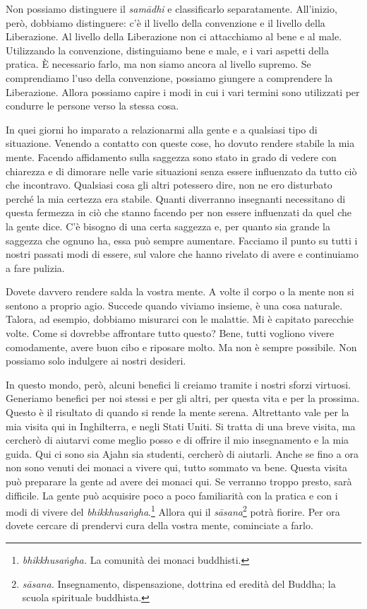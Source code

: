 Non possiamo distinguere il \emph{samādhi} e classificarlo
separatamente. All'inizio, però, dobbiamo distinguere: c'è il livello
della convenzione e il livello della Liberazione. Al livello della
Liberazione non ci attacchiamo al bene e al male. Utilizzando la
convenzione, distinguiamo bene e male, e i vari aspetti della pratica. È
necessario farlo, ma non siamo ancora al livello supremo. Se
comprendiamo l'uso della convenzione, possiamo giungere a comprendere la
Liberazione. Allora possiamo capire i modi in cui i vari termini sono
utilizzati per condurre le persone verso la stessa cosa.

In quei giorni ho imparato a relazionarmi alla gente e a qualsiasi tipo
di situazione. Venendo a contatto con queste cose, ho dovuto rendere
stabile la mia mente. Facendo affidamento sulla saggezza sono stato in
grado di vedere con chiarezza e di dimorare nelle varie situazioni senza
essere influenzato da tutto ciò che incontravo. Qualsiasi cosa gli altri
potessero dire, non ne ero disturbato perché la mia certezza era
stabile. Quanti diverranno insegnanti necessitano di questa fermezza in
ciò che stanno facendo per non essere influenzati da quel che la gente
dice. C'è bisogno di una certa saggezza e, per quanto sia grande la
saggezza che ognuno ha, essa può sempre aumentare. Facciamo il punto su
tutti i nostri passati modi di essere, sul valore che hanno rivelato di
avere e continuiamo a fare pulizia.

Dovete davvero rendere salda la vostra mente. A volte il corpo o la
mente non si sentono a proprio agio. Succede quando viviamo insieme, è
una cosa naturale. Talora, ad esempio, dobbiamo misurarci con le
malattie. Mi è capitato parecchie volte. Come si dovrebbe affrontare
tutto questo? Bene, tutti vogliono vivere comodamente, avere buon cibo e
riposare molto. Ma non è sempre possibile. Non possiamo solo indulgere
ai nostri desideri.

In questo mondo, però, alcuni benefici li creiamo tramite i nostri
sforzi virtuosi. Generiamo benefici per noi stessi e per gli altri, per
questa vita e per la prossima. Questo è il risultato di quando si rende
la mente serena. Altrettanto vale per la mia visita qui in Inghilterra,
e negli Stati Uniti. Si tratta di una breve visita, ma cercherò di
aiutarvi come meglio posso e di offrire il mio insegnamento e la mia
guida. Qui ci sono sia Ajahn sia studenti, cercherò di aiutarli. Anche
se fino a ora non sono venuti dei monaci a vivere qui, tutto sommato va
bene. Questa visita può preparare la gente ad avere dei monaci qui. Se
verranno troppo presto, sarà difficile. La gente può acquisire poco a
poco familiarità con la pratica e con i modi di vivere del
\emph{bhikkhusaṅgha}.\footnote{\emph{bhikkhusaṅgha.} La comunità dei
  monaci buddhisti.} Allora qui il \emph{sāsana}\footnote{\emph{sāsana.}
  Insegnamento, dispensazione, dottrina ed eredità del Buddha; la scuola
  spirituale buddhista.} potrà fiorire. Per ora dovete cercare di
prendervi cura della vostra mente, cominciate a farlo.

